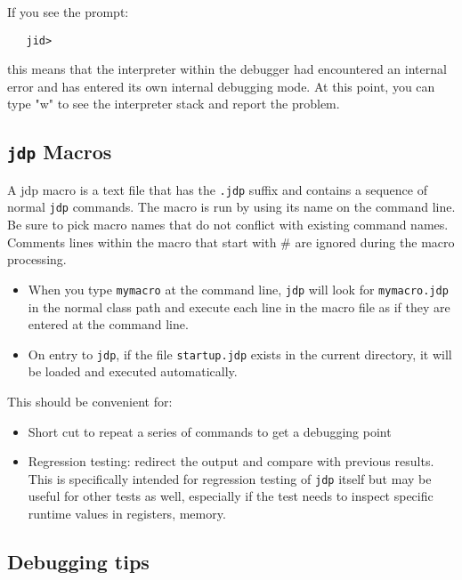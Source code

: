 If you see the prompt:
\begin{verbatim}
   jid>
\end{verbatim}
this means that the interpreter within the debugger had encountered an internal
error and has entered its own internal debugging mode. At this point, you 
can type "w" to see the interpreter stack and report the problem.

\subsection{ {\tt jdp} Macros}
A jdp macro is a text file that has the {\tt .jdp} suffix and contains a sequence of normal {\tt jdp} commands. The macro is run by using its name on the command line. Be sure to pick macro names that do not conflict with existing command names. Comments lines within the macro that start with \# are ignored during the macro processing.

\begin{itemize}
\item When you type {\tt mymacro} at the command line, {\tt jdp} will look for 
{\tt mymacro.jdp}
 in the normal class path and execute each line in the macro file as if 
 they are entered at the command line.
\item On entry to {\tt jdp}, if the file {\tt startup.jdp} exists in the current directory, 
 it will be loaded and executed automatically.
\end{itemize}

This should be convenient for:
\begin{itemize}
\item Short cut to repeat a series of commands to get a debugging point
\item Regression testing:  redirect the output and compare with previous 
 results.  This is specifically intended for regression testing of {\tt jdp} 
 itself but  may be useful for other tests as well, especially if the test 
 needs to inspect specific runtime values in registers, memory.
\end{itemize}

\subsection{Debugging tips}

